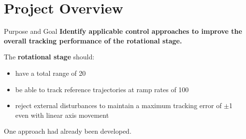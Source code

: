 \documentclass[10pt]{beamer}
\begin{document}
\section{Project Overview}

\begin{frame}[fragile]{Purpose and Goal}
  \textbf{Identify applicable control approaches to improve the overall tracking performance of the rotational stage.} \newline

  The \textbf{rotational stage} should:
  \begin{itemize}
    \item have a total range of \unit{20}{\milli\rad}
    \item be able to track reference trajectories at ramp rates of \unit{100}{\micro\radianpersecond}
    \item reject external disturbances to maintain a maximum tracking error of $\pm$\unit{1}{\micro\rad} even with linear axis movement
  \end{itemize}

  One approach had already been developed.

\end{frame}
\end{document}
